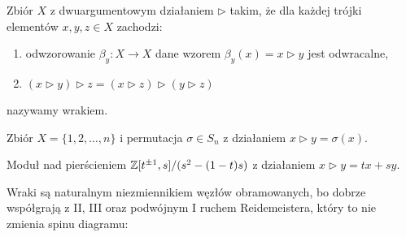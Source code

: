 \begin{definition}[wrak]
%
    Zbiór $X$ z dwuargumentowym działaniem $\triangleright$ takim, że dla każdej trójki elementów $x, y, z \in X$ zachodzi:
    \begin{enumerate}
        \item odwzorowanie $\beta_y \colon X \to X$ dane wzorem $\beta_y(x) = x \triangleright y$ jest odwracalne,
        \item $(x \triangleright y) \triangleright z = (x \triangleright z) \triangleright (y \triangleright z)$
    \end{enumerate}
    nazywamy wrakiem.
\end{definition}

\begin{example}
    Zbiór $X = \{1, 2, \ldots, n\}$ i permutacja $\sigma \in S_n$ z działaniem $x \triangleright y = \sigma(x)$.
\end{example}

\begin{example}
    Moduł nad pierścieniem $\mathbb Z[t^{\pm 1}, s]/(s^2 - (1-t)s)$ z działaniem $x \triangleright y = tx+sy$.
\end{example}

Wraki są naturalnym niezmiennikiem węzłów obramowanych, bo dobrze współgrają z II, III oraz podwójnym I ruchem Reidemeistera, który to nie zmienia spinu diagramu:
\begin{comment}
\[
    \LargeReidemeisterOneLeftRightQuandleProof
    \cong
    \LargeReidemeisterOneStraightQuandleProofRotated
\]
\end{comment}




